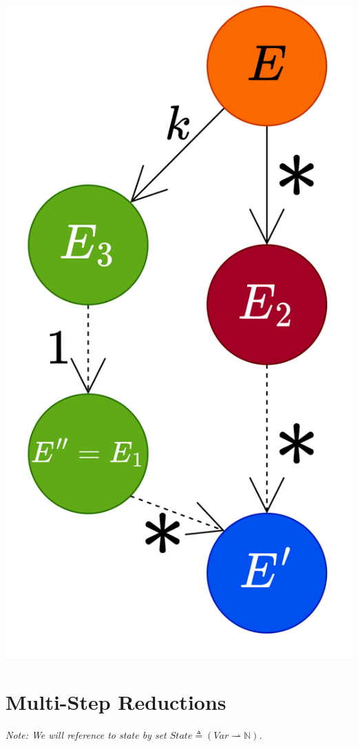 \begin{center}
	\includegraphics[scale=0.1]{structural_induction/images/confluence_inductive_case_B.drawio.png}
\end{center}


\section{Multi-Step Reductions}
\textit{Note: We will reference to state by set $State \triangleq (Var \rightharpoonup \mathbb{N})$.}

